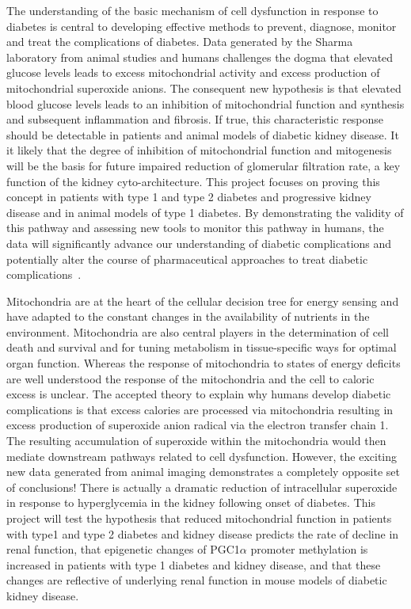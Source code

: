 \documentclass[arial,11pt]{article}
\begin{document}
The understanding of the basic mechanism of cell dysfunction in response to diabetes is central to developing effective methods to prevent, diagnose, monitor and treat the complications of diabetes. Data generated by the Sharma laboratory from animal studies and humans challenges the dogma that elevated glucose levels leads to excess mitochondrial activity and excess production of mitochondrial superoxide anions. The consequent new hypothesis is that elevated blood glucose levels leads to an inhibition of mitochondrial function and synthesis and subsequent inflammation and fibrosis. If true, this characteristic response should be detectable in patients and animal models of diabetic kidney disease. It it likely that the degree of inhibition of mitochondrial function and mitogenesis will be the basis for future impaired reduction of glomerular filtration rate, a key function of the kidney cyto-architecture. This project focuses on proving this concept in patients with type 1 and type 2 diabetes and progressive kidney disease and in animal models of type 1 diabetes. By demonstrating the validity of this pathway and assessing new tools to monitor this pathway in humans, the data will significantly advance our understanding of diabetic complications and potentially alter the course of pharmaceutical approaches to treat diabetic complications~\cite{decleves10}.

Mitochondria are at the heart of the cellular decision tree for energy sensing and have adapted to the constant changes in the availability of nutrients in the environment. Mitochondria are also central players in the determination of cell death and survival and for tuning metabolism in tissue-specific ways for optimal organ function. Whereas the response of mitochondria to states of energy deficits are well understood the response of the mitochondria and the cell to caloric excess is unclear. The accepted theory to explain why humans develop diabetic complications is that excess calories are processed via mitochondria resulting in excess production of superoxide anion radical via the electron transfer chain 1. The resulting accumulation of superoxide within the mitochondria would then mediate downstream pathways related to cell dysfunction. However, the exciting new data generated from animal imaging demonstrates a completely opposite set of conclusions! There is actually a dramatic reduction of intracellular superoxide in response to hyperglycemia in the kidney following onset of diabetes. This project will test the hypothesis that reduced mitochondrial function in patients with type1 and type 2 diabetes and kidney disease predicts the rate of decline in renal function, that epigenetic changes of \mbox{PGC1$\alpha$} promoter methylation is increased in patients with type 1 diabetes and kidney disease, and that these changes are reflective of underlying renal function in mouse models of diabetic kidney disease.
\end{document}

